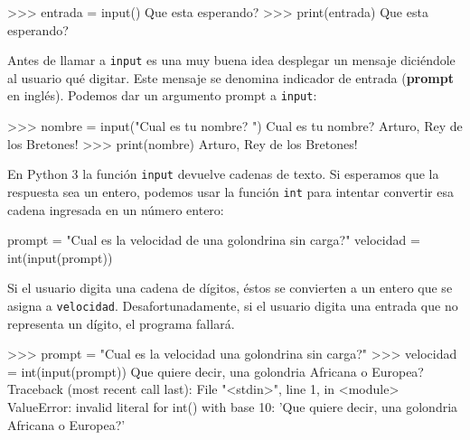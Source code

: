 \begin{pyconcode}
>>> entrada = input()
Que esta esperando?
>>> print(entrada)
Que esta esperando?
\end{pyconcode}

Antes de llamar a \texttt{input} es una muy buena idea desplegar
un mensaje diciéndole al usuario qué digitar. Este mensaje se denomina
indicador de entrada (\textbf{prompt} en inglés). Podemos dar un argumento
prompt a \texttt{input}:


\begin{pyconcode}
>>> nombre = input("Cual es tu nombre? ")
Cual es tu nombre? Arturo, Rey de los Bretones!
>>> print(nombre)
Arturo, Rey de los Bretones!
\end{pyconcode}

En Python 3 la función \texttt{input} devuelve cadenas de texto. Si esperamos 
que la respuesta sea un entero, podemos usar la función \texttt{int} para intentar
convertir esa cadena ingresada en un número entero:

\begin{pythoncode}
prompt = "Cual es la velocidad de una golondrina sin carga?\n"
velocidad = int(input(prompt))
\end{pythoncode}

Si el usuario digita una cadena de dígitos, éstos se convierten a
un entero que se asigna a \texttt{velocidad}. Desafortunadamente,
si el usuario digita una entrada que no representa un dígito, el 
programa fallará.

\begin{pyconcode}
>>> prompt = "Cual es la velocidad una golondrina sin carga?\n"
>>> velocidad = int(input(prompt))
Que quiere decir, una golondria Africana o Europea?
Traceback (most recent call last):
File "<stdin>", line 1, in <module>
ValueError: invalid literal for int() with base 10: 'Que quiere decir, una golondria Africana o Europea?'
\end{pyconcode}

